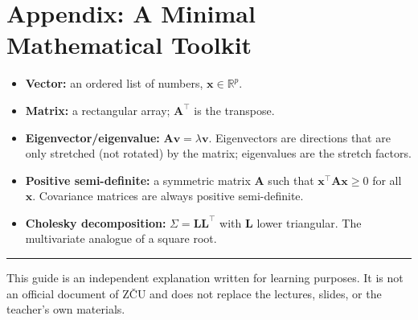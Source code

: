 \documentclass[11pt,a4paper]{article}
\newcommand{\R}{\mathbb{R}}
\newcommand{\vect}[1]{\mathbf{#1}}
\newcommand{\mat}[1]{\mathbf{#1}}
\begin{document}
\section*{Appendix: A Minimal Mathematical Toolkit}

\begin{itemize}
    \item \textbf{Vector:} an ordered list of numbers, $\vect{x}\in\R^p$.
    \item \textbf{Matrix:} a rectangular array; $\mat{A}^\top$ is the transpose.
    \item \textbf{Eigenvector/eigenvalue:} $\mat{A}\vect{v}=\lambda\vect{v}$.
          Eigenvectors are directions that are only stretched (not rotated)
          by the matrix; eigenvalues are the stretch factors.
    \item \textbf{Positive semi-definite:} a symmetric matrix $\mat{A}$
          such that $\vect{x}^\top\mat{A}\vect{x}\ge0$ for all $\vect{x}$.
          Covariance matrices are always positive semi-definite.
    \item \textbf{Cholesky decomposition:} $\Sigma=\mat{L}\mat{L}^\top$
          with $\mat{L}$ lower triangular.  The multivariate analogue of
          a square root.
\end{itemize}

\vspace{1cm}
\noindent\rule{\textwidth}{0.4pt}
\footnotesize
This guide is an independent explanation written for learning purposes.
It is not an official document of ZČU and does not replace the
lectures, slides, or the teacher’s own materials.
\normalsize
\end{document}
